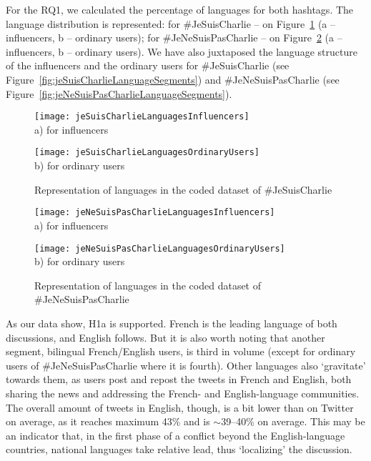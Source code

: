 For the RQ1, we calculated the percentage of languages for both hashtags. The language distribution is represented: for \#JeSuisCharlie -- on Figure~\cref{fig:jeSuisCharlieLanguages} (a -- influencers, b -- ordinary users); for \#JeNeSuisPasCharlie -- on Figure~\cref{fig:jeNeSuisPasLanguages} (a -- influencers, b -- ordinary users). We have also juxtaposed the language structure of the influencers and the ordinary users for \#JeSuisCharlie (see Figure~\cref{fig:jeSuisCharlieLanguageSegments}) and \#JeNeSuisPasCharlie (see Figure~\cref{fig:jeNeSuisPasCharlieLanguageSegments}).

\begin{figure}[ht]
	\begin{minipage}[b][][b]{0.49\linewidth}\centering
		\texttt{[image: jeSuisCharlieLanguagesInfluencers]} \\ a) for influencers
	\end{minipage}
	\hfill
	\begin{minipage}[b][][b]{0.49\linewidth}\centering
		\texttt{[image: jeSuisCharlieLanguagesOrdinaryUsers]} \\ b) for ordinary users
	\end{minipage}
	\caption{Representation of languages in the coded dataset of \#JeSuisCharlie}
	\label{fig:jeSuisCharlieLanguages}
\end{figure}

\begin{figure}[ht]
	\begin{minipage}[b][][b]{0.49\linewidth}\centering
		\texttt{[image: jeNeSuisPasCharlieLanguagesInfluencers]} \\ a) for influencers
	\end{minipage}
	\hfill
	\begin{minipage}[b][][b]{0.49\linewidth}\centering
		\texttt{[image: jeNeSuisPasCharlieLanguagesOrdinaryUsers]} \\ b) for ordinary users
	\end{minipage}
	\caption{Representation of languages in the coded dataset of \#JeNeSuisPasCharlie}
	\label{fig:jeNeSuisPasLanguages}
\end{figure}

As our data show, H1a is supported. French is the leading language of both discussions, and English follows. But it is also worth noting that another segment, bilingual French/English users, is third in volume (except for ordinary users of \#JeNeSuisPasCharlie where it is fourth). Other languages also ‘gravitate’ towards them, as users post and repost the tweets in French and English, both sharing the news and addressing the French- and English-language communities. The overall amount of tweets in English, though, is a bit lower than on Twitter on average, as it reaches maximum 43\% and is \(\sim\)39--40\% on average. This may be an indicator that, in the first phase of a conflict beyond the English-language countries, national languages take relative lead, thus ‘localizing’ the discussion.


